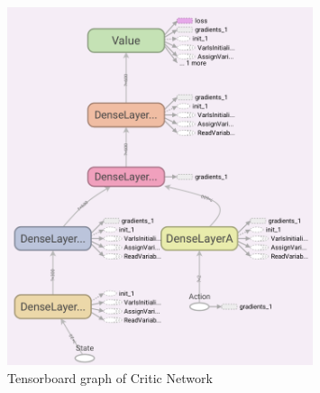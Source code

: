 \documentclass[Lau,oneside,noexaminfo]{sapthesis} %
\begin{document}
\begin{figure}[H]
\caption{Tensorboard graph of Critic Network}
\centering
\includegraphics[width=0.8\textwidth]{critic}
\end{figure}
\end{document}
